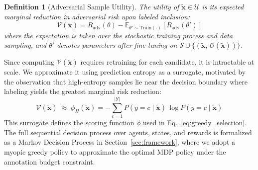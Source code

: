 \documentclass[review,1p,times,number]{elsarticle}
\newtheorem{definition}{Definition}
\begin{document}
\begin{definition}[Adversarial Sample Utility]
\label{def:asu}
The utility of $\tilde{\mathbf{x}} \in \mathcal{U}$ is its expected
marginal reduction in adversarial risk upon labeled inclusion:
\begin{equation}
\mathcal{V}(\tilde{\mathbf{x}}) =
R_{\mathrm{adv}}(\theta) -
\mathbb{E}_{\theta' \sim \mathrm{Train}(\cdot)}
\!\left[R_{\mathrm{adv}}(\theta')\right]
\label{eq:asu}
\end{equation}
where the expectation is taken over the stochastic training process
and data sampling, and $\theta'$ denotes parameters after fine-tuning
on $\mathcal{S} \cup \{(\tilde{\mathbf{x}},\,
\mathcal{O}(\tilde{\mathbf{x}}))\}$.
\end{definition}

Since computing $\mathcal{V}(\tilde{\mathbf{x}})$ requires retraining
for each candidate, it is intractable at scale. We approximate it
using prediction entropy as a surrogate, motivated by the observation
that high-entropy samples lie near the decision boundary where labeling
yields the greatest marginal risk reduction:
\begin{equation}
\mathcal{V}(\tilde{\mathbf{x}}) \;\approx\;
\phi_H(\tilde{\mathbf{x}}) =
-\sum_{c=1}^{|\mathcal{Y}|}
P(y{=}c \mid \tilde{\mathbf{x}})\,
\log P(y{=}c \mid \tilde{\mathbf{x}})
\label{eq:entropy_utility}
\end{equation}
This surrogate defines the scoring function $\phi$ used in
Eq.~\eqref{eq:greedy_selection}. The full sequential decision process
over agents, states, and rewards is formalized as a Markov Decision
Process in Section~\ref{sec:framework}, where we adopt a myopic greedy
policy to approximate the optimal MDP policy under the annotation
budget constraint.
%
\end{document}
